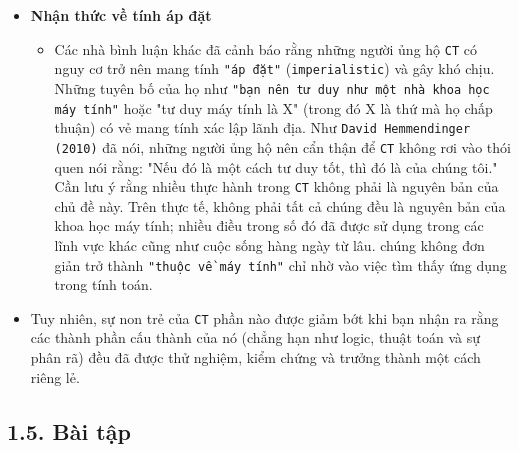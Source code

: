\begin{itemize}
\begin{itemize}
        \item \textbf{Nhận thức về tính áp đặt}
        \begin{itemize}
            \item Các nhà bình luận khác đã cảnh báo rằng những người ủng hộ \texttt{CT} có nguy cơ trở nên mang tính \verb|"áp đặt"| (\verb|imperialistic|) và gây khó chịu. Những tuyên bố của họ như \verb|"bạn nên tư duy như một nhà khoa học máy tính"| hoặc "tư duy máy tính là X" (trong đó X là thứ mà họ chấp thuận) có vẻ mang tính xác lập lãnh địa. Như \texttt{David Hemmendinger (2010)} đã nói, những người ủng hộ nên cẩn thận để \texttt{CT} không rơi vào thói quen nói rằng: "Nếu đó là một cách tư duy tốt, thì đó là của chúng tôi." Cần lưu ý rằng nhiều thực hành trong \texttt{CT} không phải là nguyên bản của chủ đề này. Trên thực tế, không phải tất cả chúng đều là nguyên bản của khoa học máy tính; nhiều điều trong số đó đã được sử dụng trong các lĩnh vực khác cũng như cuộc sống hàng ngày từ lâu. chúng không đơn giản trở thành \verb|"thuộc về máy tính"| chỉ nhờ vào việc tìm thấy ứng dụng trong tính toán.
        \end{itemize}

        \item Tuy nhiên, sự non trẻ của \texttt{CT} phần nào được giảm bớt khi bạn nhận ra rằng các thành phần cấu thành của nó (chẳng hạn như logic, thuật toán và sự phân rã) đều đã được thử nghiệm, kiểm chứng và trưởng thành một cách riêng lẻ.
    \end{itemize}

\end{itemize}

\subsection*{1.5. Bài tập}

